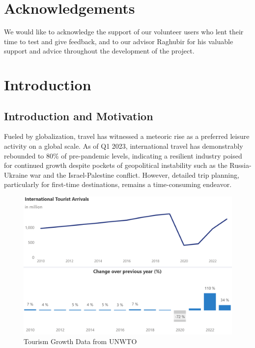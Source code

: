 \documentclass[12pt,a4paper]{report}
\begin{document}
\chapter*{Acknowledgements}

We would like to acknowledge the support of our volunteer users who lent their time to test and give feedback, and to our advisor Raghubir for his valuable support and advice throughout the development of the project.

\newpage
\setcounter{page}{1}

\chapter{Introduction}

\section{Introduction and Motivation}

Fueled by globalization, travel has witnessed a meteoric rise as a preferred leisure activity on a global scale. As of Q1 2023, international travel has demonstrably rebounded to 80\% of pre-pandemic levels, indicating a resilient industry poised for continued growth despite pockets of geopolitical instability such as the Russia-Ukraine war and the Israel-Palestine conflict. However, detailed trip planning, particularly for first-time destinations, remains a time-consuming endeavor. 
\begin{figure}[h]
    \centering
    \includegraphics[scale=.5]{tourismgrowth}
    \caption{Tourism Growth Data from UNWTO\citep{unworldtourism}}
\end{figure}
\end{document}
